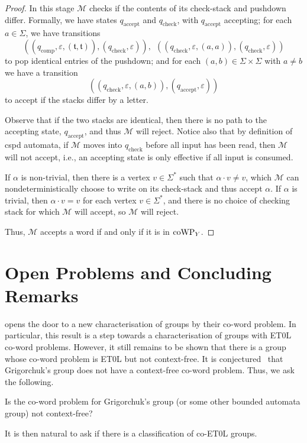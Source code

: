 \begin{proof}
	In this stage $\mathcal{M}$  checks if the contents of its check-stack and pushdown differ.
	Formally, we have states $q_\mathrm{accept}$ and  $q_{\mathrm{check}}$, with $q_\mathrm{accept}$ accepting;
	for each $a \in \Sigma$, we have transitions
	\[
	(
	(q_\mathrm{comp}, \varepsilon, (\mathfrak{t},\mathfrak{t})),
	(q_\mathrm{check}, \varepsilon)
	),
	\ \ 
	(
	(q_\mathrm{check}, \varepsilon, (a,a)),
	(q_\mathrm{check}, \varepsilon)
	)
	\]
	to pop identical entries of the pushdown; and for each $(a,b) \in \Sigma \times \Sigma$ with $a \neq b$ we have a transition
	\[
	(
	(q_\mathrm{check},\varepsilon,(a,b)),
	(q_\mathrm{accept},\varepsilon)
	)
	\]
	to accept if the stacks differ by a letter.
	
	Observe that if the two stacks are identical, then there is no path to the accepting state, $q_\mathrm{accept}$, and thus $\mathcal{M}$ will reject.
	Notice also that by definition of cspd automata, if $\mathcal M$ moves into  $q_{\mathrm{check}}$ before all input has been read, then $\mathcal{M}$ will not accept, i.e., an accepting state is only effective if all input is consumed.
	
	
	If $\alpha$ is non-trivial, then there is a vertex $v \in \Sigma^*$ such that $\alpha \cdot v \neq v$, which $\mathcal{M}$ can nondeterministically choose to write on its check-stack and thus accept $\alpha$.
	If $\alpha$ is trivial, then $\alpha \cdot v = v$ for each vertex $v \in \Sigma^*$, and there is no choice of checking stack for which $\mathcal{M}$ will accept, so $\mathcal{M}$ will reject.
	
	Thus, $\mathcal{M}$ accepts a word if and only if it is in $\mathrm{coWP}_Y$.
\end{proof}

\section{Open Problems and Concluding Remarks}

 opens the door to a new characterisation of groups by their co-word problem.
In particular, this result is a step towards a characterisation of groups with ET0L co-word problems.
However, it still remains to be shown that there is a group whose co-word problem is ET0L but not context-free.
It is conjectured~\cite[2]{bleak2016} that Grigorchuk's group does not have a context-free co-word problem.
Thus, we ask the following.

\begin{question}
	Is the co-word problem for Grigorchuk's group (or some other bounded automata group) not context-free?
\end{question}

It is then natural to ask if there is a classification of co-ET0L groups.
